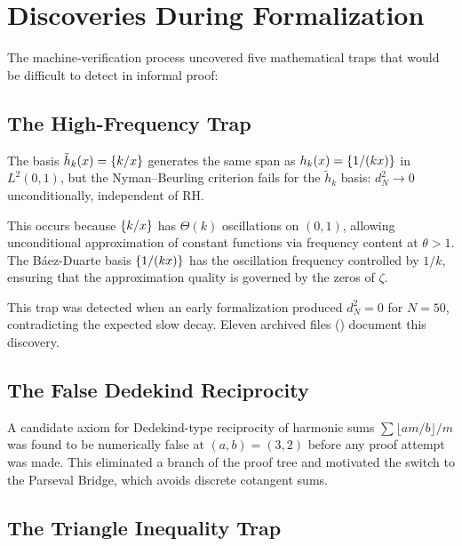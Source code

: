 \documentclass[11pt,a4paper]{article}
\begin{document}
\section{Discoveries During Formalization}
\label{sec:traps}

The machine-verification process uncovered five mathematical traps
that would be difficult to detect in informal proof:

\subsection{The High-Frequency Trap}

\begin{theorem}[Informal]
The basis $\tilde{h}_k(x) = \{k/x\}$ generates the same span as
$h_k(x) = \{1/(kx)\}$ in $L^2(0,1)$, but the Nyman--Beurling
criterion fails for the $\tilde{h}_k$ basis: $d_N^2 \to 0$
unconditionally, independent of RH.
\end{theorem}

This occurs because $\{k/x\}$ has $\Theta(k)$ oscillations on
$(0,1)$, allowing unconditional approximation of constant functions via
frequency content at $\theta > 1$. The B\'aez-Duarte basis
$\{1/(kx)\}$ has the oscillation frequency controlled by $1/k$,
ensuring that the approximation quality is governed by the zeros of $\zeta$.

This trap was detected when an early formalization produced
$d_N^2 = 0$ for $N = 50$, contradicting the expected slow decay.
Eleven archived files () document
this discovery.

\subsection{The False Dedekind Reciprocity}

A candidate axiom for Dedekind-type reciprocity of harmonic sums
$\sum \lfloor am/b \rfloor / m$ was found to be numerically false
at $(a,b) = (3,2)$ before any proof attempt was made. This eliminated
a branch of the proof tree and motivated the switch to the Parseval
Bridge, which avoids discrete cotangent sums.

\subsection{The Triangle Inequality Trap}
\end{document}
